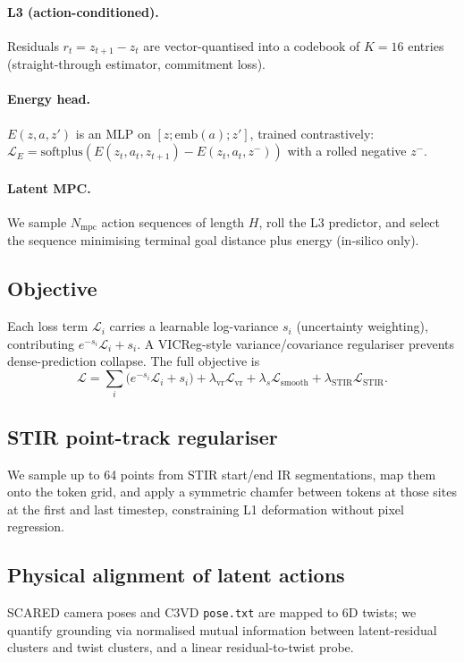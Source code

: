 \documentclass[final,3p,times,twocolumn]{elsarticle}
\begin{document}
\paragraph{L3 (action-conditioned).} Residuals $r_t = z_{t+1}-z_t$ are vector-quantised into a codebook of $K{=}16$ entries (straight-through estimator, commitment loss).

\paragraph{Energy head.} $E(z,a,z')$ is an MLP on $[z;\mathrm{emb}(a);z']$, trained contrastively: $\mathcal{L}_E = \mathrm{softplus}(E(z_t,a_t,z_{t+1}) - E(z_t,a_t,z^{-}))$ with a rolled negative $z^{-}$.

\paragraph{Latent MPC.} We sample $N_{\mathrm{mpc}}$ action sequences of length $H$, roll the L3 predictor, and select the sequence minimising terminal goal distance plus energy (in-silico only).

\subsection{Objective}
Each loss term $\mathcal{L}_i$ carries a learnable log-variance $s_i$ (uncertainty weighting), contributing $e^{-s_i}\mathcal{L}_i + s_i$. A VICReg-style variance/covariance regulariser prevents dense-prediction collapse. The full objective is
\begin{equation}
\mathcal{L} = \textstyle\sum_i \big(e^{-s_i}\mathcal{L}_i + s_i\big) + \lambda_{\mathrm{vr}}\mathcal{L}_{\mathrm{vr}} + \lambda_s \mathcal{L}_{\mathrm{smooth}} + \lambda_{\mathrm{STIR}}\mathcal{L}_{\mathrm{STIR}} .
\end{equation}

\subsection{STIR point-track regulariser}
We sample up to 64 points from STIR start/end IR segmentations, map them onto the token grid, and apply a symmetric chamfer between tokens at those sites at the first and last timestep, constraining L1 deformation without pixel regression.

\subsection{Physical alignment of latent actions}
SCARED camera poses and C3VD \texttt{pose.txt} are mapped to 6D twists; we quantify grounding via normalised mutual information between latent-residual clusters and twist clusters, and a linear residual-to-twist probe.
\end{document}
